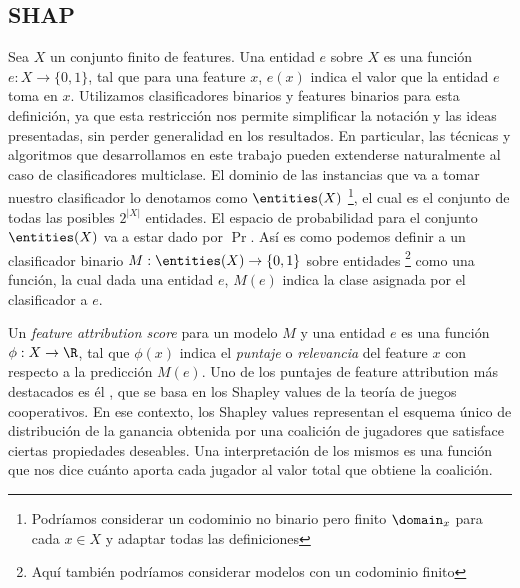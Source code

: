 \subsection{SHAP}


Sea $X$ un conjunto finito de features. Una entidad $e$ sobre $X$ es una función $e: X \to \{0,1\}$, tal que para una feature $x$, $e(x)$ indica el valor que la entidad $e$ toma en $x$. Utilizamos clasificadores binarios y features binarios para esta definición, ya que esta restricción nos permite simplificar la notación y las ideas presentadas, sin perder generalidad en los resultados. En particular, las técnicas y algoritmos que desarrollamos en este trabajo pueden extenderse naturalmente al caso de clasificadores multiclase. El dominio de las instancias que va a tomar nuestro clasificador lo denotamos como $\entities(X)$ \footnote{Podríamos considerar un codominio no binario pero finito $\domain_x$ para cada $x \in X$ y adaptar todas las definiciones}, el cual es el conjunto de todas las posibles $2^{|X|}$ entidades. El espacio de probabilidad para el conjunto \(\entities(X)\) va a estar dado por \(\Pr\). Así es como podemos definir a un clasificador binario $M: \entities(X) \to \{0,1\}$ sobre entidades \footnote{Aquí también podríamos considerar modelos con un codominio finito} como una función, la cual dada una entidad $e$, $M(e)$ indica la clase asignada por el clasificador a $e$. %

Un \textit{feature attribution score} para un modelo $M$ y una entidad $e$ es una función $\phi : X \to \R$, tal que $\phi(x)$ indica el \textit{puntaje} o \textit{relevancia} del feature $x$ con respecto a la predicción $M(e)$. Uno de los puntajes de feature attribution más destacados es él \SHAPscore{} \cite{shapOriginalPaper}, que se basa en los Shapley values \cite{shapley1953value} de la teoría de juegos cooperativos. En ese contexto, los Shapley values representan el esquema único de distribución de la ganancia obtenida por una coalición de jugadores que satisface ciertas propiedades deseables. Una interpretación de los mismos es una función que nos dice cuánto aporta cada jugador al valor total que obtiene la coalición. %

